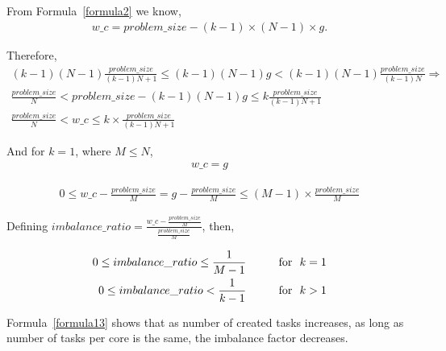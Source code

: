 From Formula~\ref{formula2} we know,
\begin{equation}\label{formula17}
\begin{aligned}
w\_c={problem\_{size}}-(k-1)\times(N-1)\times{g}.
\end{aligned}
\end{equation}

Therefore,
\begin{equation}\label{formula18}
\begin{aligned}
(k-1)(N-1)\frac{problem\_{size}}{(k-1){N}+1}\leq{(k-1)(N-1){g}}<(k-1)(N-1)\frac{problem\_{size}}{(k-1){N}}\Rightarrow\\
{\frac{problem\_{size}}{N}}<{problem\_{size}-{(k-1)(N-1){g}}}\leq{k\frac{problem\_{size}}{(k-1){N}+1}}\\
{\frac{problem\_{size}}{N}}<{w\_{c}}\leq{k\times\frac{problem\_{size}}{(k-1){N}+1}}
\end{aligned}
\end{equation}

And for $k=1$, where $M\leq{N}$,
\begin{align*}\label{formula12}
w\_c=g
\end{align*}

\begin{equation}\label{formula14}
\begin{aligned}
0\leq{w\_c-\frac{problem\_{size}}{M}}={g-\frac{problem\_{size}}{M}}\leq(M-1)\times{\frac{problem\_{size}}{M}}
\end{aligned}
\end{equation}


Defining $imbalance\_{ratio}=\frac{w\_c-\frac{problem\_{size}}{M}}{\frac{problem\_{size}}{M}}$, then,

\begin{equation}\label{formula13}
\begin{aligned}
0\leq{imbalance\_{ratio}}\leq\frac{1}{M-1}  \text{\:\:\:\:\:\:\:\:\:\:\:\:\:for\:\:\:}k={1}\\
0\leq{imbalance\_{ratio}}<\frac{1}{k-1}  \text{\:\:\:\:\:\:\:\:\:\:\:\:\:for\:\:\:}k>{1}\\
\end{aligned}
\end{equation}

Formula~\ref{formula13} shows that as number of created tasks increases, as long as number of tasks per core is the same, the imbalance factor decreases. 

